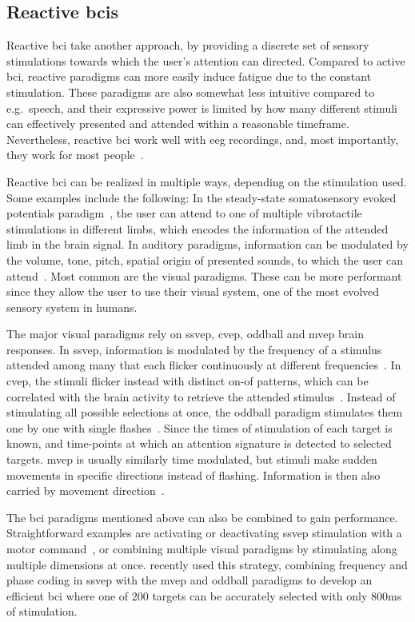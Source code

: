 \subsection{Reactive \acsp{bci}}
Reactive \ac{bci} take another approach, by providing a discrete set of
sensory stimulations towards which the user's attention can directed.
Compared to active \ac{bci}, reactive paradigms can more easily induce fatigue
due to the constant stimulation.
These paradigms are also somewhat less intuitive compared to e.g.\ speech, and
their expressive power is limited by how many different stimuli can effectively
presented and attended within a reasonable timeframe.
Nevertheless, reactive \ac{bci} work well with \ac{eeg} recordings, and, most
importantly, they work for most people~\cite{Allison2010a,Edlinger2014}.

Reactive \ac{bci} can be realized in multiple ways, depending on the
stimulation used.
Some examples include the following:
In the steady-state somatosensory evoked potentials paradigm~\cite{Petit2021},
the user can attend to one of multiple vibrotactile stimulations in different
limbs, which encodes the information of the attended limb in the brain signal.
In auditory paradigms, information can be modulated by the volume, tone, pitch,
spatial origin of presented sounds, to which the user can
attend~\cite{Kaongoen2017}.
Most common are the visual paradigms.
These can be more performant since they allow the user to use their visual
system, one of the most evolved sensory system in humans.

The major visual paradigms rely on
\ac{ssvep}, \ac{cvep}, oddball and \ac{mvep} brain responses.
In \ac{ssvep}, information is modulated by the frequency of a stimulus attended
among many that each flicker continuously at different
frequencies~\cite{Chen2021}.
In \ac{cvep}, the stimuli flicker instead with distinct on-of patterns, which can
be correlated with the brain activity to retrieve the attended
stimulus~\cite{Sun2022}.
Instead of stimulating all possible selections at once, the oddball paradigm
stimulates them one by one with single flashes~\cite{Pan2022}.
Since the times of stimulation of each target is known, and time-points at
which an attention signature is detected to selected targets.
\Ac{mvep} is usually similarly time modulated, but stimuli make sudden
movements in specific directions instead of flashing.
Information is then also carried by movement
direction~\cite{Libert2021a,Libert2022}.

The \ac{bci} paradigms mentioned above can also be combined to gain performance.
Straightforward examples are activating or deactivating \ac{ssvep} stimulation
with a motor command~\cite{Neeling2019}, or combining multiple visual paradigms by stimulating
along multiple dimensions at once.
\textcite{Han2023} recently used this strategy, combining frequency and phase
coding in \ac{ssvep} with the \ac{mvep} and oddball paradigms to develop an
efficient \ac{bci} where one of 200 targets can be accurately selected with
only 800ms of stimulation.

